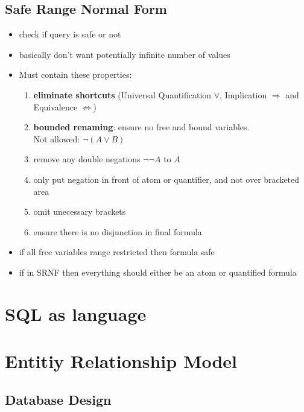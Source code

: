 \documentclass{article}
\newcommand\tab[1][0.5cm]{\hspace*{#1}}
\begin{document}
	\subsection{Safe Range Normal Form}
		\begin{itemize}
			\item check if query is safe or not
			\item basically don't want potentially infinite number of values

			\item Must contain these properties:
				\begin{enumerate}
					\item \textbf{eliminate shortcuts} (Universal Quantification $\forall$, Implication $\Rightarrow$ and Equivalence $\Leftrightarrow$)
					\item \textbf{bounded renaming}: ensure no free and bound variables.\\ \tab Not allowed: $\neg (A \vee B)$
					\item remove any double negations $\neg \neg A$ to $A$
					\item only put negation in front of atom or quantifier, and not over bracketed area
					\item omit unecessary brackets
					\item ensure there is no disjunction in final formula
				\end{enumerate}

			\item if all free variables range restricted then formula safe
			\item if in SRNF then everything should either be an atom or quantified formula
		\end{itemize}



\section{SQL as language}

\section{Entitiy Relationship Model}
	\subsection{Database Design}
\end{document}
